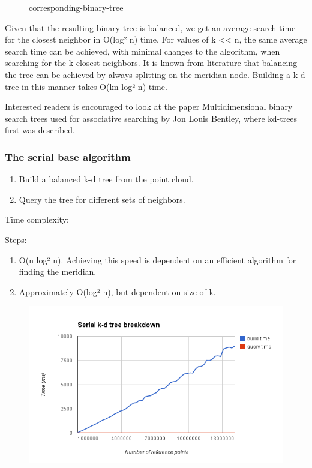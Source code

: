 \begin{enumerate}
\begin{enumerate}
\begin{figure}[ht!]
\caption{corresponding-binary-tree}
\label{fig:tree_0001}
\end{figure}

Given that the resulting binary tree is balanced, we get an average search time for the closest neighbor in O(log² n) time. For values of k << n, the same average search time can be achieved, with minimal changes to the algorithm, when searching for the k closest neighbors. It is known from literature that balancing the tree can be achieved by always splitting on the meridian node. Building a k-d tree in this manner takes O(kn log² n) time.

Interested readers is encouraged to look at the paper Multidimensional binary search trees used for associative searching by Jon Louis Bentley, where kd-trees first was described.

\subsubsection{The serial base algorithm} %
\label{ssub:the_serial_base_algorithm}

\begin{enumerate}
    \item Build a balanced k-d tree from the point cloud.
    \item Query the tree for different sets of neighbors.
\end{enumerate}

Time complexity:

Steps:
\begin{enumerate}
    \item O(n log² n). Achieving this speed is dependent on an efficient algorithm for finding the meridian.
    \item Approximately O(log² n), but dependent on size of k.
\end{enumerate}

\begin{figure}[ht!]
\centering
\includegraphics[width=120mm]{gfx/serial-k-d-tree-breakdown.png}


\end{figure}
\end{enumerate}
\end{enumerate}

